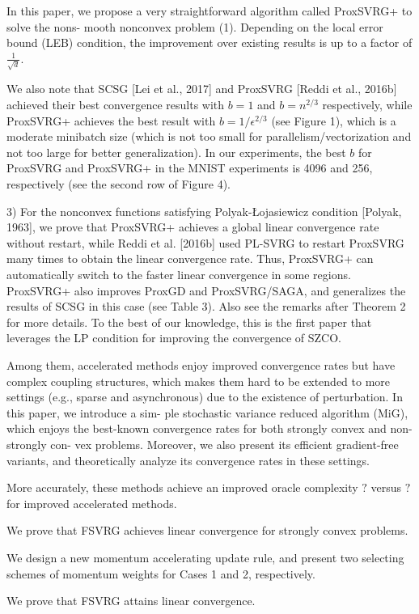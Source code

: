 \documentclass{article}
\theoremstyle{definition}
\theoremstyle{remark}
\begin{document}
{\color{Violet}
In this paper, we propose a very straightforward algorithm called ProxSVRG+ to solve the nons-
mooth nonconvex problem (1). 
{\color{RubineRed} Depending on the local
error bound (LEB) condition, the improvement over existing results is up to a factor of $\frac{1}{\sqrt{d}}$.}



We also note that SCSG [Lei et al., 2017] and ProxSVRG [Reddi et al., 2016b] achieved their best convergence
results with $b = 1$ and $b = n^{2/3}$ respectively, while ProxSVRG+ achieves the best result with $b = 1/\epsilon^{2/3}$ (see
Figure 1), which is a moderate minibatch size (which is not too small for parallelism/vectorization and not too
large for better generalization). In our experiments, the best $b$ for ProxSVRG and ProxSVRG+ in the MNIST
experiments is 4096 and 256, respectively (see the second row of Figure 4).

3) For the nonconvex functions satisfying Polyak-Łojasiewicz condition [Polyak, 1963], we prove that ProxSVRG+
achieves a global linear convergence rate without restart, while Reddi et al. [2016b] used PL-SVRG to restart
ProxSVRG many times to obtain the linear convergence rate. Thus, ProxSVRG+ can automatically switch to
the faster linear convergence in some regions. ProxSVRG+ also improves ProxGD and ProxSVRG/SAGA, and
generalizes the results of SCSG in this case (see Table 3). Also see the remarks after Theorem 2 for more details. {\color{RubineRed}
To the best of
our knowledge, this is the first paper that leverages the LP condition for improving the convergence of SZCO.
}
}

{\color{DarkOrchid}
Among them, accelerated
methods enjoy improved convergence rates but
have complex coupling structures, which makes
them hard to be extended to more settings (e.g.,
sparse and asynchronous) due to the existence of
perturbation. In this paper, we introduce a sim-
ple stochastic variance reduced algorithm (MiG),
which enjoys the best-known convergence rates
for both strongly convex and non-strongly con-
vex problems. Moreover, we also present its efficient gradient-free variants, and theoretically analyze its convergence rates in these
settings.

More accurately, these methods achieve an improved oracle complexity $?$ versus $?$ for improved accelerated methods.

We prove that FSVRG achieves linear convergence for
strongly convex problems.

We design a new momentum accelerating update rule,
and present two selecting schemes of momentum weights for Cases 1 and 2, respectively.

We prove that FSVRG attains linear convergence.
}
\end{document}
